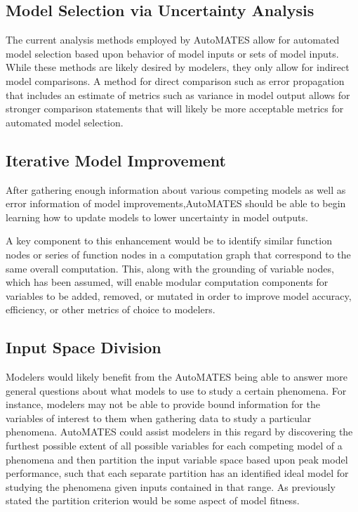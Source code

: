 \subsection{Model Selection via Uncertainty Analysis \label{auto_uncert_analysis}}
The current analysis methods employed by AutoMATES allow for automated model selection based upon behavior of model inputs or sets of model inputs. While these methods are likely desired by modelers, they only allow for indirect model comparisons. A method for direct comparison such as error propagation that includes an estimate of metrics such as variance in model output allows for stronger comparison statements that will likely be more acceptable metrics for automated model selection.

\subsection{Iterative Model Improvement\label{sec:auto_improve}}
After gathering enough information about various competing models as well as error information of model improvements,AutoMATES should be able to begin learning how to update models to lower uncertainty in model outputs.

A key component to this enhancement would be to identify similar function nodes or series of function nodes in a computation graph that correspond to the same overall computation. This, along with the grounding of variable nodes, which has been assumed, will enable modular computation components for variables to be added, removed, or mutated in order to improve model accuracy, efficiency, or other metrics of choice to modelers.

\subsection{Input Space Division\label{sec:auto_isd}}
Modelers would likely benefit from the AutoMATES being able to answer more general questions about what models to use to study a certain phenomena. For instance, modelers may not be able to provide bound information for the variables of interest to them when gathering data to study a particular phenomena. AutoMATES could assist modelers in this regard by discovering the furthest possible extent of all possible variables for each competing model of a phenomena and then partition the input variable space based upon peak model performance, such that each separate partition has an identified ideal model for studying the phenomena given inputs contained in that range. As previously stated the partition criterion would be some aspect of model fitness.

